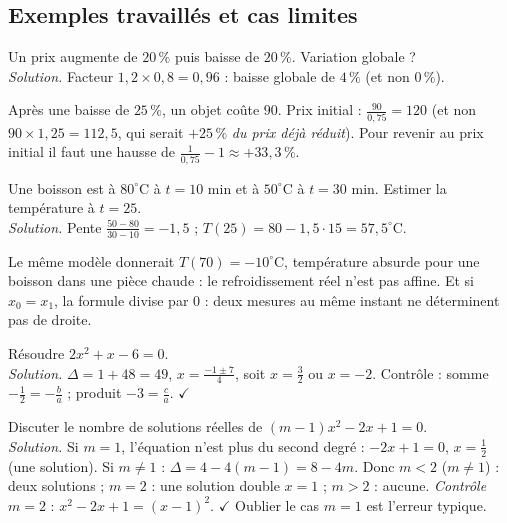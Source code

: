 \subsection{Exemples travaillés et cas limites}
\begin{exemple}
Un prix augmente de $20\,\%$ puis baisse de $20\,\%$. Variation globale ?\\
\emph{Solution.} Facteur $1{,}2\times0{,}8=0{,}96$ : baisse globale de $4\,\%$ (et non $0\,\%$).
\end{exemple}
\begin{cas}
Après une baisse de $25\,\%$, un objet coûte $90$. Prix initial : $\frac{90}{0{,}75}=120$ (et non $90\times1{,}25=112{,}5$, qui serait $+25\,\%$ \emph{du prix déjà réduit}). Pour revenir au prix initial il faut une hausse de $\frac1{0{,}75}-1\approx+33{,}3\,\%$.
\end{cas}
\begin{exemple}[interpolation]
Une boisson est à $80^\circ$C à $t=10$ min et à $50^\circ$C à $t=30$ min. Estimer la température à $t=25$.\\
\emph{Solution.} Pente $\frac{50-80}{30-10}=-1{,}5$ ; $T(25)=80-1{,}5\cdot15=57{,}5^\circ$C.
\end{exemple}
\begin{cas}
Le même modèle donnerait $T(70)=-10^\circ$C, température absurde pour une boisson dans une pièce chaude : le refroidissement réel n'est pas affine. Et si $x_0=x_1$, la formule divise par $0$ : deux mesures au même instant ne déterminent pas de droite.
\end{cas}
\begin{exemple}[discriminant]
Résoudre $2x^2+x-6=0$.\\
\emph{Solution.} $\Delta=1+48=49$, $x=\frac{-1\pm7}4$, soit $x=\frac32$ ou $x=-2$. Contrôle : somme $-\frac12=-\frac ba$ ; produit $-3=\frac ca$. $\checkmark$
\end{exemple}
\begin{cas}
Discuter le nombre de solutions réelles de $(m-1)x^2-2x+1=0$.\\
\emph{Solution.} Si $m=1$, l'équation n'est plus du second degré : $-2x+1=0$, $x=\frac12$ (une solution). Si $m\ne1$ : $\Delta=4-4(m-1)=8-4m$. Donc $m<2$ ($m\ne1$) : deux solutions ; $m=2$ : une solution double $x=1$ ; $m>2$ : aucune. \emph{Contrôle} $m=2$ : $x^2-2x+1=(x-1)^2$. $\checkmark$ Oublier le cas $m=1$ est l'erreur typique.
\end{cas}
